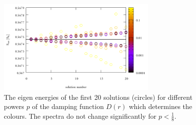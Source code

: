 \begin{figure}
\includegraphics[width=0.7\textwidth]{Figures/IFem_powers_spectra}
\caption{The eigen energies of the first 20 solutions (circles) for different powers $p$ of the damping function $D(r)$ which determines the colours.
The spectra do not change significantly for $p<\frac 18$.}
\label{fig:powerSpect}
\end{figure}

%
%

